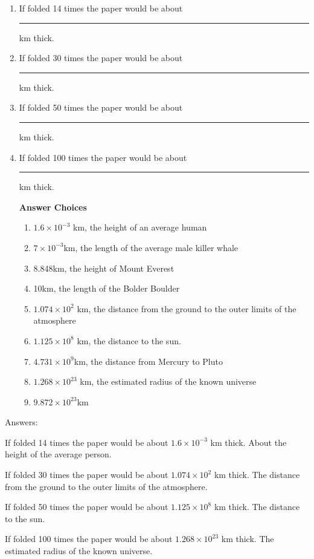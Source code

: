 \documentclass{article}
\begin{document}
\begin{enumerate}

\item If folded 14 times the paper would be about \rule{1in}{0.01in} km thick. 

\item If folded 30 times the paper would be about \rule{1in}{0.01in} km thick.

\item If folded 50 times the paper would be about \rule{1in}{0.01in} km thick.

\item If folded 100 times the paper would be about \rule{1in}{0.01in} km thick.

\vspace{0.2in}

\textbf{Answer Choices}

\begin{enumerate}

\item $1.6\times10^{-3}$ km, the height of an average human

\item $7\times10^{-3}$km, the length of the average male killer whale

\item 8.848km, the height of Mount Everest

\item 10km, the length of the Bolder Boulder

\item $1.074\times10^2$ km, the distance from the ground to the outer limits of the atmosphere

\item $1.125\times10^8$ km, the distance to the sun.

\item $4.731\times10^9$km, the distance from Mercury to Pluto

\item $1.268\times10^{23}$ km, the estimated radius of the known universe

\item $9.872\times10^{23}$km

\end{enumerate}

\end{enumerate}

\newpage

Answers:

If folded 14 times the paper would be about $1.6\times10^{-3}$ km thick. About the height of the average person.

If folded 30 times the paper would be about $1.074\times10^2$ km thick. The distance from the ground to the outer limits of the atmosphere.

If folded 50 times the paper would be about $1.125\times10^8$ km thick. The distance to the sun.

If folded 100 times the paper would be about $1.268\times10^{23}$ km thick. The estimated radius of the known universe.
\end{document}
